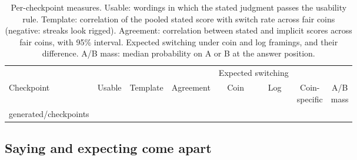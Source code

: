 \documentclass[11pt]{article}
\makeatletter
\newcommand*{\rows}[1]{\@@input #1 }
\makeatother
\begin{document}
\begin{table}[t]
\centering
\footnotesize
\caption{Per-checkpoint measures. Usable: wordings in which the stated judgment passes the usability rule. Template: correlation of the pooled stated score with switch rate across fair coins (negative: streaks look rigged). Agreement: correlation between stated and implicit scores across fair coins, with 95\% interval. Expected switching under coin and log framings, and their difference. A/B mass: median probability on A or B at the answer position.}
\label{tab:checkpoints}
\setlength{\tabcolsep}{4pt}
\begin{tabular}{@{}lccccccc@{}}
\toprule
 & & & & \multicolumn{2}{c}{Expected switching} & & \\
\cmidrule(lr){5-6}
Checkpoint & Usable & Template & Agreement & Coin & Log & \makecell{Coin-\\specific} & \makecell{A/B\\mass} \\
\midrule
\rows{generated/checkpoints}
\bottomrule
\end{tabular}
\end{table}

\subsection{Saying and expecting come apart}
\label{sec:agreement}
\end{document}
